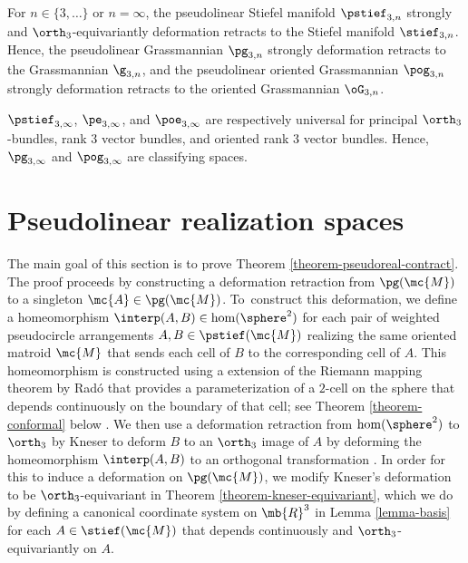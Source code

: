 \begin{theorem}\label{theorem-grassman-pseudograssman}
For $n \in \{3,\dots\}$ or $n = \infty$,
the pseudolinear Stiefel manifold $\pstief_{3,n}$ strongly and $\orth_3$-equivariantly deformation retracts to the Stiefel manifold $\stief_{3,n}$. Hence, the pseudolinear Grassmannian $\pg_{3,n}$ strongly deformation retracts to the Grassmannian $\g_{3,n}$, and the pseudolinear oriented Grassmannian $\pog_{3,n}$ strongly deformation retracts to the oriented Grassmannian $\oG_{3,n}$.
\end{theorem}

\begin{corollary}\label{corollary-classifying}
$\pstief_{3,\infty}$, $\pe_{3,\infty}$, and $\poe_{3,\infty}$ are respectively universal for principal $\orth_3$-bundles, rank $3$ vector bundles, and oriented rank $3$ vector bundles.
Hence, $\pg_{3,\infty}$ and $\pog_{3,\infty}$ are classifying spaces.
\end{corollary}

\section{Pseudolinear realization spaces}\label{section-contractible}

The main goal of this section is to prove Theorem \ref{theorem-pseudoreal-contract}.
The proof proceeds by constructing a deformation retraction from $\pg(\mc{M})$ to a singleton $\mc{A} \in \pg(\mc{M})$. To~construct this deformation, we define a homeomorphism $\interp(A,B) \in \hom(\sphere^2)$ for each pair of weighted pseudocircle arrangements $A,B \in \pstief(\mc{M})$ realizing the same oriented matroid $\mc{M}$ that sends each cell of $B$ to the corresponding cell of $A$. This homeomorphism is constructed using a extension of the Riemann mapping theorem by Radó that provides a parameterization of a $2$-cell on the sphere that depends continuously on the boundary of that cell; see Theorem \ref{theorem-conformal} below \cite{rado1923representation}. We then use a deformation retraction from $\hom(\sphere^2)$ to $\orth_3$ by Kneser to deform $B$ to an $\orth_3$ image of $A$ by deforming the homeomorphism $\interp(A,B)$ to an orthogonal transformation \cite{kneser1926deformationssatze}. In order for this to induce a deformation on $\pg(\mc{M})$, we modify Kneser's deformation to be $\orth_3$-equivariant in Theorem \ref{theorem-kneser-equivariant}, which we do by defining a canonical coordinate system on $\mb{R}^3$ in Lemma \ref{lemma-basis} for each $A \in \stief(\mc{M})$ that depends continuously and $\orth_3$-equivariantly on $A$.

